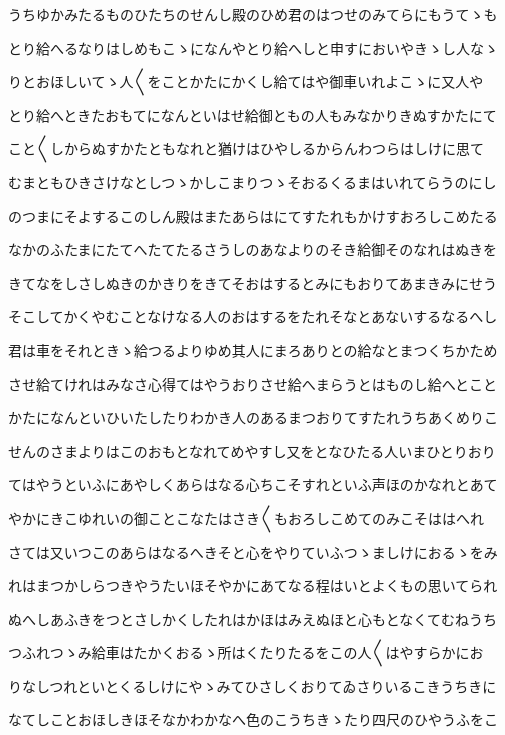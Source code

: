 \documentclass[a4paper,11pt,landscape]{ltjtarticle}
\begin{document}
うちゆかみたるものひたちのせんし殿のひめ君のはつせのみてらにもうてゝも
\par\medskip
とり給へるなりはしめもこゝになんやとり給へしと申すにおいやきゝし人なゝ
\par\medskip
りとおほしいてゝ人〱をことかたにかくし給てはや御車いれよこゝに又人や
\par\medskip
とり給へときたおもてになんといはせ給御ともの人もみなかりきぬすかたにて
\par\medskip
こと〱しからぬすかたともなれと猶けはひやしるからんわつらはしけに思て
\par\medskip
むまともひきさけなとしつゝかしこまりつゝそおるくるまはいれてらうのにし
\par\medskip
のつまにそよするこのしん殿はまたあらはにてすたれもかけすおろしこめたる
\par\medskip
なかのふたまにたてへたてたるさうしのあなよりのそき給御そのなれはぬきを
\par\medskip
きてなをしさしぬきのかきりをきてそおはするとみにもおりてあまきみにせう
\par\medskip
そこしてかくやむことなけなる人のおはするをたれそなとあないするなるへし
\par\medskip
君は車をそれときゝ給つるよりゆめ其人にまろありとの給なとまつくちかため
\par\medskip
させ給てけれはみなさ心得てはやうおりさせ給へまらうとはものし給へとこと
\par\medskip
かたになんといひいたしたりわかき人のあるまつおりてすたれうちあくめりこ
\par\medskip
せんのさまよりはこのおもとなれてめやすし又をとなひたる人いまひとりおり
\par\medskip
てはやうといふにあやしくあらはなる心ちこそすれといふ声ほのかなれとあて
\par\medskip
やかにきこゆれいの御ことこなたはさき〱もおろしこめてのみこそははへれ
\par\medskip
さては又いつこのあらはなるへきそと心をやりていふつゝましけにおるゝをみ
\par\medskip
れはまつかしらつきやうたいほそやかにあてなる程はいとよくもの思いてられ
\par\medskip
ぬへしあふきをつとさしかくしたれはかほはみえぬほと心もとなくてむねうち
\par\medskip
つふれつゝみ給車はたかくおるゝ所はくたりたるをこの人〱はやすらかにお
\par\medskip
りなしつれといとくるしけにやゝみてひさしくおりてゐさりいるこきうちきに
\par\medskip
なてしことおほしきほそなかわかなへ色のこうちきゝたり四尺のひやうふをこ
\end{document}
